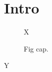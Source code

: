 \documentclass[journal,article,submit,pdftex,moreauthors]{mdpi}
\begin{document}
\section{Intro}
\begin{figure}\centering X\caption{Fig cap.}\end{figure}
\begin{table}\caption{Tab cap.}\centering Y\end{table}
\end{document}
